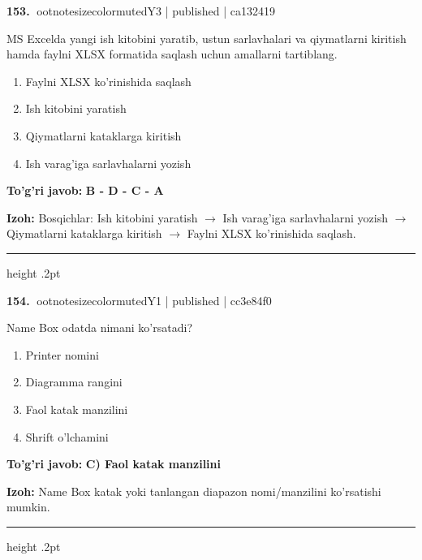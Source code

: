 \documentclass[10pt,a4paper]{article}
\begin{document}
\textbf{\color{ink}153.} {ootnotesizecolor{muted}Y3 | published | ca132419}
\par
MS Excelda yangi ish kitobini yaratib, ustun sarlavhalari va qiymatlarni kiritish hamda faylni XLSX formatida saqlash uchun amallarni tartiblang.
\begin{enumerate}[label=\Alph*),leftmargin=9mm]
\item Faylni XLSX ko'rinishida saqlash
\item Ish kitobini yaratish
\item Qiymatlarni kataklarga kiritish
\item Ish varag'iga sarlavhalarni yozish
\end{enumerate}
\begin{tcolorbox}[enhanced,breakable,colback=teal!4,colframe=teal!55!black,boxrule=0.45pt,arc=1.2mm,left=2.8mm,right=2.8mm,top=2mm,bottom=2mm]
\textbf{\color{teal}To'g'ri javob:} \textbf{B - D - C - A}
\par\smallskip
\textbf{Izoh:} Bosqichlar: Ish kitobini yaratish \ensuremath{\rightarrow} Ish varag'iga sarlavhalarni yozish \ensuremath{\rightarrow} Qiymatlarni kataklarga kiritish \ensuremath{\rightarrow} Faylni XLSX ko'rinishida saqlash.
\end{tcolorbox}
\vspace{2mm}\hrule height .2pt\vspace{2mm}

\textbf{\color{ink}154.} {ootnotesizecolor{muted}Y1 | published | cc3e84f0}
\par
Name Box odatda nimani ko'rsatadi?
\begin{enumerate}[label=\Alph*),leftmargin=9mm]
\item Printer nomini
\item Diagramma rangini
\item Faol katak manzilini
\item Shrift o'lchamini
\end{enumerate}
\begin{tcolorbox}[enhanced,breakable,colback=teal!4,colframe=teal!55!black,boxrule=0.45pt,arc=1.2mm,left=2.8mm,right=2.8mm,top=2mm,bottom=2mm]
\textbf{\color{teal}To'g'ri javob:} \textbf{C) Faol katak manzilini}
\par\smallskip
\textbf{Izoh:} Name Box katak yoki tanlangan diapazon nomi/manzilini ko'rsatishi mumkin.
\end{tcolorbox}
\vspace{2mm}\hrule height .2pt\vspace{2mm}
\end{document}
